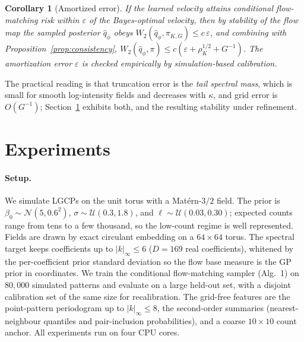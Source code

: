 \documentclass[10pt,twocolumn]{article}
\newtheorem{corollary}{Corollary}
\newcommand{\eps}{\varepsilon}
\begin{document}
\begin{corollary}[Amortized error]\label{cor:amort}
If the learned velocity attains conditional flow-matching risk within $\eps$ of
the Bayes-optimal velocity, then by stability of the flow map the sampled posterior
$\hat q_\phi$ obeys $W_2(\hat q_\phi,\pi_{K,G})\le c\,\eps$, and combining with
Proposition~\ref{prop:consistency},
$W_2(\hat q_\phi,\pi)\le c(\eps+\rho_K^{1/2}+G^{-1})$. The amortization error
$\eps$ is checked empirically by simulation-based calibration.
\end{corollary}

The practical reading is that
truncation error is the \emph{tail spectral mass}, which is small for smooth
log-intensity fields and decreases with $\kappa$, and grid error is $O(G^{-1})$;
Section~\ref{sec:exp} exhibits both, and the resulting stability under refinement.

\section{Experiments}
\label{sec:exp}

\paragraph{Setup.}
We simulate LGCPs on the unit torus with a Mat\'ern-$3/2$ field. The prior is
$\beta_0\sim\mathcal N(5,0.6^2)$, $\sigma\sim\mathcal U(0.3,1.8)$, and
$\ell\sim\mathcal U(0.03,0.30)$; expected counts range from tens to a few
thousand, so the low-count regime is well represented. Fields are drawn by exact
circulant embedding on a $64\times64$ torus. The spectral target keeps
coefficients up to $|k|_\infty\le6$ ($D=169$ real coefficients), whitened by the
per-coefficient prior standard deviation so the flow base measure is the GP prior
in coordinates. We train the conditional flow-matching sampler (Alg.~1) on
$80{,}000$ simulated patterns and evaluate on a large held-out set, with a
disjoint calibration set of the same size for recalibration. The grid-free
features are the point-pattern periodogram up to $|k|_\infty\le8$, the
second-order summaries (nearest-neighbour quantiles and pair-inclusion
probabilities), and a coarse $10\times10$ count anchor. All experiments run on four
CPU cores.
\end{document}
